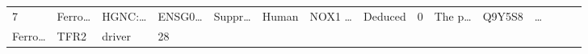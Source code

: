 \documentclass[
]{article}
\begin{document}
\begin{longtable}[]{@{}lllllllllllllll@{}}
\begin{minipage}[t]{0.02\columnwidth}
7\strut
\end{minipage} & \begin{minipage}[t]{0.05\columnwidth}\raggedright
Ferro\ldots{}\strut
\end{minipage} & \begin{minipage}[t]{0.05\columnwidth}\raggedright
HGNC:\ldots{}\strut
\end{minipage} & \begin{minipage}[t]{0.05\columnwidth}\raggedright
ENSG0\ldots{}\strut
\end{minipage} & \begin{minipage}[t]{0.05\columnwidth}\raggedright
Suppr\ldots{}\strut
\end{minipage} & \begin{minipage}[t]{0.05\columnwidth}\raggedright
Human\strut
\end{minipage} & \begin{minipage}[t]{0.05\columnwidth}\raggedright
NOX1 \ldots{}\strut
\end{minipage} & \begin{minipage}[t]{0.05\columnwidth}\raggedright
Deduced\strut
\end{minipage} & \begin{minipage}[t]{0.05\columnwidth}\raggedright
0\strut
\end{minipage} & \begin{minipage}[t]{0.05\columnwidth}\raggedright
The p\ldots{}\strut
\end{minipage} & \begin{minipage}[t]{0.05\columnwidth}\raggedright
Q9Y5S8\strut
\end{minipage} & \begin{minipage}[t]{0.02\columnwidth}\raggedright
\ldots{}\strut
\end{minipage}\tabularnewline
\begin{minipage}[t]{0.05\columnwidth}\raggedright
Ferro\ldots{}\strut
\end{minipage} & \begin{minipage}[t]{0.05\columnwidth}\raggedright
TFR2\strut
\end{minipage} & \begin{minipage}[t]{0.04\columnwidth}\raggedright
driver\strut
\end{minipage} & \begin{minipage}[t]{0.02\columnwidth}\raggedright
28\strut
\end{minipage} & \begin{minipage}[t]{0.05\columnwidth}\raggedright

\end{minipage}
\end{longtable}
\end{document}
